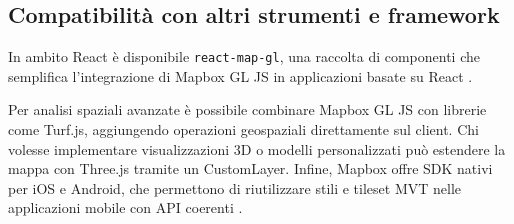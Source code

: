 \subsection{Compatibilità con altri strumenti e framework}  
In ambito React è disponibile \texttt{react-map-gl}, una raccolta di componenti che semplifica l'integrazione di Mapbox GL JS in applicazioni basate su React \cite{react-map-gl,mapbox-react-tutorial}.  

Per analisi spaziali avanzate è possibile combinare Mapbox GL JS con librerie come Turf.js, aggiungendo operazioni geospaziali direttamente sul client.  
Chi volesse implementare visualizzazioni 3D o modelli personalizzati può estendere la mappa con Three.js tramite un CustomLayer.  
Infine, Mapbox offre SDK nativi per iOS e Android, che permettono di riutilizzare stili e tileset MVT nelle applicazioni mobile con API coerenti \cite{mapbox-ios, mapbox-mobile-sdk}.  

\newpage
